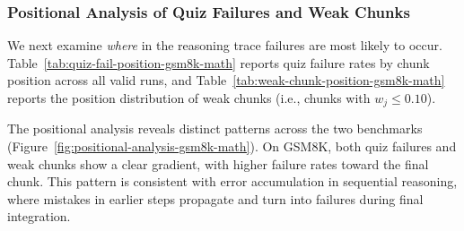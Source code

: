 \documentclass[12pt]{report}
\begin{document}
\subsubsection{Positional Analysis of Quiz Failures and Weak Chunks}
\label{sec:positional-analysis}

We next examine \emph{where} in the reasoning trace failures are
most likely to occur.  Table~\ref{tab:quiz-fail-position-gsm8k-math} reports
quiz failure rates by chunk position across all valid runs, and
Table~\ref{tab:weak-chunk-position-gsm8k-math} reports the position distribution
of weak chunks (i.e., chunks with $w_j \le 0.10$).

The positional analysis reveals distinct patterns across the two
benchmarks (Figure~\ref{fig:positional-analysis-gsm8k-math}). On GSM8K, both quiz failures and weak chunks show a clear gradient, with higher failure rates toward the final chunk. 
This pattern is consistent with error accumulation in sequential reasoning, where mistakes in earlier steps propagate and turn into failures during final integration.
\end{document}
